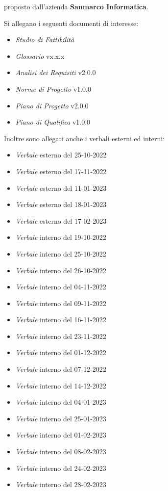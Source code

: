 \documentclass[10pt]{article}
\begin{document}
proposto dall’azienda \textbf{Sanmarco Informatica}.


Si allegano i seguenti documenti di interesse:
\begin{itemize}
  \item \textit{\textit{Studio di Fattibilità}}
  \item \textit{Glossario} vx.x.x
  \item \textit{Analisi dei Requisiti} v2.0.0
  \item \textit{Norme di Progetto} v1.0.0
  \item \textit{Piano di Progetto} v2.0.0
  \item \textit{Piano di Qualifica} v1.0.0
\end{itemize}

Inoltre sono allegati anche i verbali esterni ed interni:

\begin{itemize}
  \item \textit{Verbale} esterno del 25-10-2022
  \item \textit{Verbale} esterno del 17-11-2022
  \item \textit{Verbale} esterno del 11-01-2023
  \item \textit{Verbale} esterno del 18-01-2023
  \item \textit{Verbale} esterno del 17-02-2023
  \item \textit{Verbale} interno del 19-10-2022
  \item \textit{Verbale} interno del 25-10-2022
  \item \textit{Verbale} interno del 26-10-2022
  \item \textit{Verbale} interno del 04-11-2022
  \item \textit{Verbale} interno del 09-11-2022
  \item \textit{Verbale} interno del 16-11-2022
  \item \textit{Verbale} interno del 23-11-2022
  \item \textit{Verbale} interno del 01-12-2022
  \item \textit{Verbale} interno del 07-12-2022
  \item \textit{Verbale} interno del 14-12-2022
  \item \textit{Verbale} interno del 04-01-2023
  \item \textit{Verbale} interno del 25-01-2023
  \item \textit{Verbale} interno del 01-02-2023
  \item \textit{Verbale} interno del 08-02-2023
  \item \textit{Verbale} interno del 24-02-2023
  \item \textit{Verbale} interno del 28-02-2023
\end{itemize}
\end{document}
